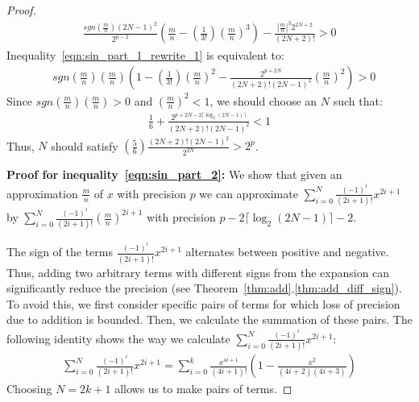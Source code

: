 \documentclass{article}
\numberwithin{mytheorem}{section}
\newcommand{\taylorsin}[3] {\sum_{i=#1}^{#2}\frac{(-1)^i}{(2i+1)!}{#3}^{2i+1}}
\begin{document}
\begin{proof}
\begin{align}
\frac{sgn(\frac{m}{n})(2N-1)^2}{2^{p-2}}(\frac{m}{n}-(\frac{1}{3!})(\frac{m}{n})^3)-\frac{|\frac{m}{n}|^{3}2^{2N+2}}{(2N+2)!}>0\label{eqn:sin_part_1_rewrite_1}
\end{align}
Inequality~\eqref{eqn:sin_part_1_rewrite_1} is equivalent to: 
\begin{align*}
&sgn(\frac{m}{n})(\frac{m}{n})(1-(\frac{1}{3!})(\frac{m}{n})^2-\frac{2^{p+2N}}{(2N+2)!(2N-1)^2}(\frac{m}{n})^2)>0
\end{align*}
Since $sgn(\frac{m}{n})(\frac{m}{n})>0$ and $(\frac{m}{n})^2<1$, we should choose an $N$ such that:
\begin{align*}
\frac{1}{6}+\frac{2^{p+2N-2\lceil\log_2(2N-1) \rceil}}{(2N+2)!(2N-1)^2}<1
\end{align*}
Thus, $N$ should satisfy $(\frac{5}{6})\frac{(2N+2)!(2N-1)^2}{2^{2N}}>2^p$.

\noindent\textbf{Proof for inequality~\eqref{eqn:sin_part_2}:} We show that given an approximation $\frac{m}{n}$ of $x$ with precision $p$ we can approximate $\taylorsin{0}{N}{x}$ by $\taylorsin{0}{N}{(\frac{m}{n})}$ with precision $p-2\lceil\log_2(2N-1)\rceil -2$.  

The sign of the terms $\frac{(-1)^i}{(2i+1)!}x^{2i+1}$ alternates between positive and negative. Thus, adding two arbitrary terms with different signs from the expansion can significantly reduce the precision (see Theorem~\ref{thm:add}.\ref{thm:add_diff_sign}). To avoid this, we first consider specific pairs of terms for which loss of precision due to addition is bounded. Then, we calculate the summation of these pairs. The following identity shows the way we calculate $\taylorsin{0}{N}{x}$:
\begin{align*}
\taylorsin{0}{N}{x}=\sum_{i=0}^{k}\frac{x^{4i+1}}{(4i+1)!}(1-\frac{x^2}{(4i+2)(4i+3)})
\end{align*}
Choosing $N=2k+1$ allows us to make pairs of terms. 


\end{proof}
\end{document}
